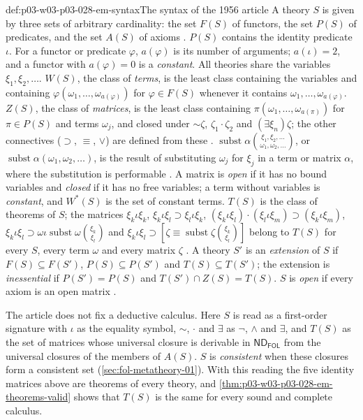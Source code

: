\begin{hbconvention}{def:p03-w03-p03-028-em-syntax}{The syntax of the 1956 article}
A theory \(S\) is given by three sets of arbitrary cardinality: the set
\(F(S)\) of functors, the set \(P(S)\) of predicates, and the set \(A(S)\) of
axioms \cite[p.~51]{EhrenfeuchtMostowski1956}.  \(P(S)\) contains the
identity predicate \(\iota\).  For a functor or predicate \(\varphi\),
\(a(\varphi)\) is its number of arguments; \(a(\iota)=2\), and a functor with
\(a(\varphi)=0\) is a \emph{constant}.  All theories share the variables
\(\xi_1,\xi_2,\ldots\).  \(W(S)\), the class of \emph{terms}, is the least
class containing the variables and containing
\(\varphi(\omega_1,\ldots,\omega_{a(\varphi)})\) for \(\varphi\in F(S)\)
whenever it contains \(\omega_1,\ldots,\omega_{a(\varphi)}\).  \(Z(S)\), the
class of \emph{matrices}, is the least class containing
\(\pi(\omega_1,\ldots,\omega_{a(\pi)})\) for \(\pi\in P(S)\) and terms
\(\omega_j\), and closed under \(\mathord\sim\zeta\), \(\zeta_1\cdot\zeta_2\)
and \((\exists\xi_n)\zeta\); the other connectives (\(\supset\), \(\equiv\),
\(\vee\)) are defined from these \cite[p.~51]{EhrenfeuchtMostowski1956}.
\(\operatorname{subst}\alpha\binom{\xi_1,\xi_2,\ldots}{\omega_1,\omega_2,\ldots}\),
or \(\operatorname{subst}\alpha(\omega_1,\omega_2,\ldots)\), is the result of
substituting \(\omega_j\) for \(\xi_j\) in a term or matrix \(\alpha\), where
the substitution is performable \cite[p.~52]{EhrenfeuchtMostowski1956}.  A
matrix is \emph{open} if it has no bound variables and \emph{closed} if it has
no free variables; a term without variables is \emph{constant}, and \(W^*(S)\)
is the set of constant terms.  \(T(S)\) is the class of theorems of \(S\); the
matrices
\(\xi_k\iota\xi_k\), \(\xi_k\iota\xi_l\supset\xi_l\iota\xi_k\),
\((\xi_k\iota\xi_l)\cdot(\xi_l\iota\xi_m)\supset(\xi_k\iota\xi_m)\),
\(\xi_k\iota\xi_l\supset\omega\iota\operatorname{subst}\omega\binom{\xi_k}{\xi_l}\)
and
\(\xi_k\iota\xi_l\supset[\zeta\equiv\operatorname{subst}\zeta\binom{\xi_k}{\xi_l}]\)
belong to \(T(S)\) for every \(S\), every term \(\omega\) and every matrix
\(\zeta\) \cite[p.~52]{EhrenfeuchtMostowski1956}.  A theory \(S'\) is an
\emph{extension} of \(S\) if \(F(S)\subseteq F(S')\), \(P(S)\subseteq P(S')\)
and \(T(S)\subseteq T(S')\); the extension is \emph{inessential} if
\(P(S')=P(S)\) and \(T(S')\cap Z(S)=T(S)\).  \(S\) is \emph{open} if every
axiom is an open matrix \cite[p.~52]{EhrenfeuchtMostowski1956}.

The article does not fix a deductive calculus.  Here \(S\) is read as a
first-order signature with \(\iota\) as the equality symbol, \(\mathord\sim\),
\(\cdot\) and \(\exists\) as \(\neg\), \(\land\) and \(\exists\), and
\(T(S)\) as the set of matrices whose universal closure is derivable in
\(\mathsf{ND}_{\mathsf{FOL}}\) from the universal closures of the members of
\(A(S)\).  \(S\) is \emph{consistent} when these closures form a consistent
set (\cref{sec:fol-metatheory-01}).  With this reading the five
identity matrices above are theorems of every theory, and
\cref{thm:p03-w03-p03-028-em-theorems-valid} shows that \(T(S)\) is the same
for every sound and complete calculus.
\end{hbconvention}

